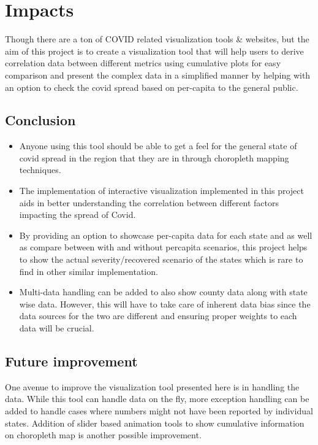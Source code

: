\section{Impacts}
\label{sec:impact}

Though there are a ton of COVID related visualization tools \& websites, but the aim of this project is to create a visualization tool that will help users to derive correlation data between different metrics using cumulative plots for easy comparison and present the complex data in a simplified manner by helping with an option to check the covid spread based on per-capita to the general public.  
\subsection{Conclusion}
\begin{itemize}
\item Anyone using this tool should be able to get a feel for the general state of covid spread in the region that they are in through choropleth mapping techniques. 
\item The implementation of interactive visualization implemented in this project aids in better understanding the correlation between different factors impacting the spread of Covid. 
\item By providing an option to showcase per-capita data for each state and as well as compare between with and without percapita scenarios, this project helps to show the actual severity/recovered scenario of the states which is rare to find in other similar implementation.
\item Multi-data handling can be added to also show county data along with state wise data. However, this will have to take care of inherent data bias since the data sources for the two are different and ensuring proper weights to each data will be crucial.
\end{itemize}

\subsection{Future improvement}
One avenue to improve the visualization tool presented here is in handling the data. While this tool can handle data on the fly, more exception handling can be added to handle cases where numbers might not have been reported by individual states. Addition of slider based animation tools to show cumulative information on choropleth map is another possible improvement.

